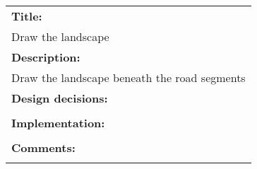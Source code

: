 \pagebreak
\begin{tabular}{ | p{12cm} | }
	\hline
	\textbf{Title:} \\
	Draw the landscape
	\\ \hline
	\textbf{Description:} \\
	Draw the landscape beneath the road segments
	\\ \hline
	\textbf{Design decisions:} \\
	\\ \hline
	\textbf{Implementation:} \\
	\\ \hline
	\textbf{Comments:} \\
	\\ \hline
\end{tabular}